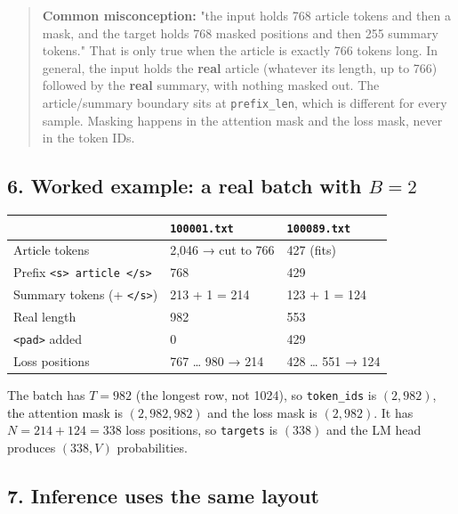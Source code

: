 \documentclass[11pt,a4paper,oneside]{report}
\begin{document}
\begin{quote}
\textbf{Common misconception:} "the input holds 768 article tokens and then a mask, and the target holds 768 masked positions and then 255 summary tokens." That is only true when the article is exactly 766 tokens long. In general, the input holds the \textbf{real} article (whatever its length, up to 766) followed by the \textbf{real} summary, with nothing masked out. The article/summary boundary sits at \texttt{prefix\_\allowbreak{}len}, which is different for every sample. Masking happens in the attention mask and the loss mask, never in the token IDs.
\end{quote}

\subsection{\texorpdfstring{6. Worked example: a real batch with \(B = 2\)}{6. Worked example: a real batch with B = 2}}\label{6-worked-example-a-real-batch-with-b--2}

{\def\LTcaptype{none} %
\begin{longtable}[]{@{}lll@{}}
\toprule\noalign{}
& \texttt{100001.\allowbreak{}txt} & \texttt{100089.\allowbreak{}txt} \\
\midrule\noalign{}
\endhead
\bottomrule\noalign{}
\endlastfoot
Article tokens & 2,046 → cut to 766 & 427 (fits) \\
Prefix \texttt{\textless{}s\textgreater{}\ article\ \textless{}/\allowbreak{}s\textgreater{}} & 768 & 429 \\
Summary tokens (+ \texttt{\textless{}/\allowbreak{}s\textgreater{}}) & 213 + 1 = 214 & 123 + 1 = 124 \\
Real length & 982 & 553 \\
\texttt{\textless{}pad\textgreater{}} added & 0 & 429 \\
Loss positions & 767 \ldots{} 980 → 214 & 428 \ldots{} 551 → 124 \\
\end{longtable}
}

The batch has \(T = 982\) (the longest row, not 1024), so \texttt{token\_\allowbreak{}ids} is \((2, 982)\), the attention mask is \((2, 982, 982)\) and the loss mask is \((2, 982)\). It has \(N = 214 + 124 = 338\) loss positions, so \texttt{targets} is \((338)\) and the LM head produces \((338, V)\) probabilities.

\subsection{7. Inference uses the same layout}\label{7-inference-uses-the-same-layout}
\end{document}
